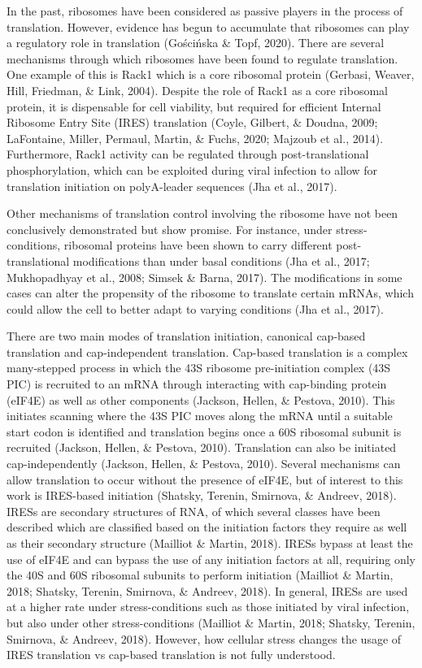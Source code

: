 \documentclass[12pt,oneside]{reedthesis}
\begin{document}
In the past, ribosomes have been considered as passive players in the
process of translation. However, evidence has begun to accumulate that
ribosomes can play a regulatory role in translation
(Gościńska \& Topf, 2020). There are several mechanisms
through which ribosomes have been found to regulate translation. One
example of this is Rack1 which is a core ribosomal protein
(Gerbasi, Weaver, Hill, Friedman, \& Link, 2004). Despite the role of Rack1 as a
core ribosomal protein, it is dispensable for cell viability, but
required for efficient Internal Ribosome Entry Site (IRES) translation
(Coyle, Gilbert, \& Doudna, 2009; LaFontaine, Miller, Permaul, Martin, \& Fuchs, 2020; Majzoub et al., 2014). Furthermore, Rack1 activity
can be regulated through post-translational phosphorylation, which can be
exploited during viral infection to allow for translation initiation on
polyA-leader sequences (Jha et al., 2017).

Other mechanisms of translation control involving the ribosome have not
been conclusively demonstrated but show promise. For instance, under
stress-conditions, ribosomal proteins have been shown to carry different
post-translational modifications than under basal conditions
(Jha et al., 2017; Mukhopadhyay et al., 2008; Simsek \& Barna, 2017). The modifications in some cases can
alter the propensity of the ribosome to translate certain mRNAs, which
could allow the cell to better adapt to varying conditions
(Jha et al., 2017).

There are two main modes of translation initiation, canonical cap-based
translation and cap-independent translation. Cap-based translation is a
complex many-stepped process in which the 43S ribosome pre-initiation
complex (43S PIC) is recruited to an mRNA through interacting with
cap-binding protein (eIF4E) as well as other components
(Jackson, Hellen, \& Pestova, 2010). This initiates scanning
where the 43S PIC moves along the mRNA until a suitable start codon is
identified and translation begins once a 60S ribosomal subunit is
recruited (Jackson, Hellen, \& Pestova, 2010). Translation
can also be initiated cap-independently
(Jackson, Hellen, \& Pestova, 2010). Several mechanisms can
allow translation to occur without the presence of eIF4E, but of
interest to this work is IRES-based initiation
(Shatsky, Terenin, Smirnova, \& Andreev, 2018). IRESs are secondary
structures of RNA, of which several classes have been described which are
classified based on the initiation factors they require as well as their
secondary structure (Mailliot \& Martin, 2018). IRESs
bypass at least the use of eIF4E and can bypass the use of any
initiation factors at all, requiring only the 40S and 60S ribosomal
subunits to perform initiation (Mailliot \& Martin, 2018; Shatsky, Terenin, Smirnova, \& Andreev, 2018). In general, IRESs are used
at a higher rate under stress-conditions such as those initiated by
viral infection, but also under other stress-conditions
(Mailliot \& Martin, 2018; Shatsky, Terenin, Smirnova, \& Andreev, 2018). However, how cellular
stress changes the usage of IRES translation vs cap-based translation is
not fully understood.
\end{document}
